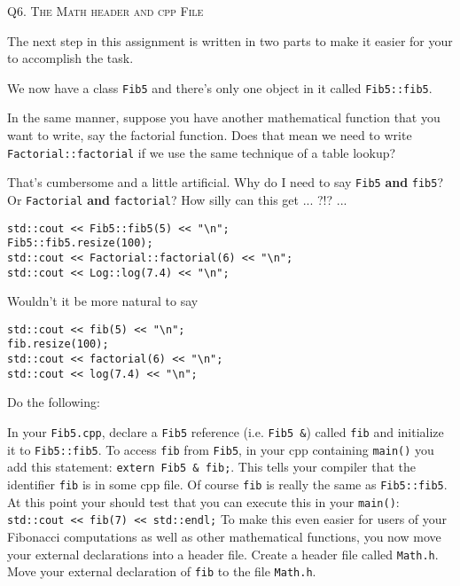 \newpage
Q6. \textsc{The Math header and cpp File}

The next step in this assignment is written in two parts to make it easier for your to accomplish the
task.

We now have a class \texttt{Fib5} and there's only one object in it called \texttt{Fib5::fib5}.

In the same manner, suppose you have another mathematical function that you want to write, say the
factorial function. Does that mean we need to write \texttt{Factorial::factorial} if we use the same
technique of a table lookup?

That's cumbersome and a little artificial. Why do I need to say \texttt{Fib5} \textbf{and} \verb!fib5!? Or \texttt{Factorial} \textbf{and}
\verb!factorial!? How silly can this get ... ?!? ...

\begin{Verbatim}[frame=single]
std::cout << Fib5::fib5(5) << "\n";
Fib5::fib5.resize(100);
std::cout << Factorial::factorial(6) << "\n";
std::cout << Log::log(7.4) << "\n";
\end{Verbatim}

Wouldn't it be more natural to say

\begin{Verbatim}[frame=single]
std::cout << fib(5) << "\n";
fib.resize(100);
std::cout << factorial(6) << "\n";
std::cout << log(7.4) << "\n";
\end{Verbatim}

Do the following:
\begin{tightlist}
  \li In your \texttt{Fib5.cpp}, declare a \texttt{Fib5} reference (i.e. \texttt{Fib5 \&}) called \verb!fib! and initialize it to
  \texttt{Fib5::fib5}.
  \li To access \verb!fib! from \texttt{Fib5}, in your cpp containing
  \texttt{main()} you add this statement:
  \texttt{extern Fib5 \& fib;}.
  This tells your compiler that the identifier \verb!fib! is in some cpp file.
  Of course \verb!fib! is really the
  same as \texttt{Fib5::fib5}. At this point your should test that you
  can execute this in your
  \texttt{main()}:
      \verb!std::cout << fib(7) << std::endl;!
      \li To make this even easier for users of your Fibonacci computations as
      well as other
      mathematical functions, you now move your external declarations into
      a header file. Create a
  header file called \texttt{Math.h}. Move your external declaration of \verb!fib! to the file \texttt{Math.h}.
\end{tightlist}

